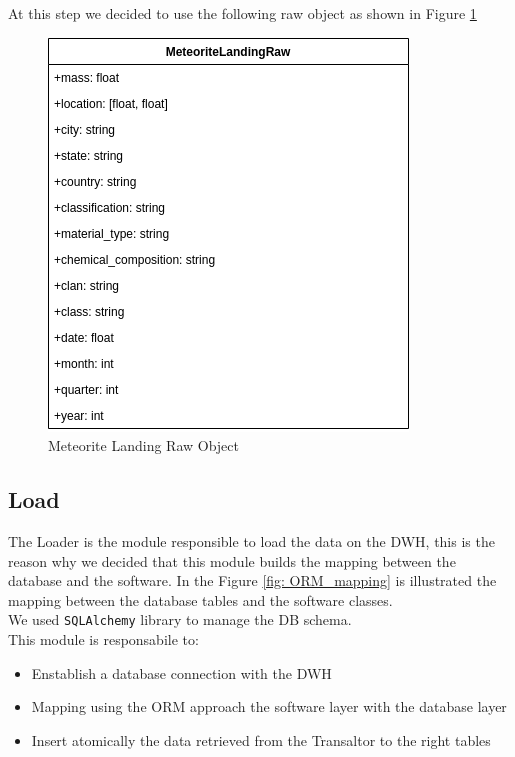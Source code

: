 \documentclass[conference]{IEEEtran}
\begin{document}
	At this step we decided to use the following raw object as shown in Figure \ref{fig:MeteoriteLandingRaw}
	\begin{figure}[htpb]
		\centering
		\includegraphics[width=\columnwidth]{images/meteorite_landing_raw.png}
		\caption{Meteorite Landing Raw Object}
		\label{fig:MeteoriteLandingRaw}
	\end{figure}
	
	\subsection{Load}
	The Loader is the module responsible to load the data on the DWH, this is the reason why we decided that this module builds the mapping between the database and the software. In the Figure \ref{fig: ORM_mapping} is illustrated the mapping between the database tables and the software classes.\\ We used \texttt{SQLAlchemy} library to manage the DB schema.\\ This module is responsabile to:
	\begin{itemize}
		\item Enstablish a database connection with the DWH
		\item Mapping using the ORM approach the software layer with the database layer
		\item Insert atomically the data retrieved from the Transaltor to the right tables
	\end{itemize}
	
\end{document}
